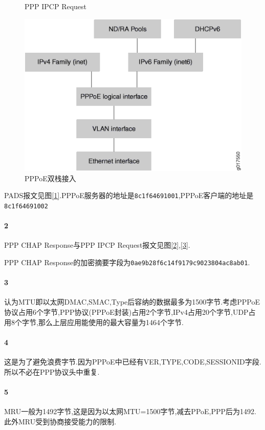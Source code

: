 \documentclass[a4paper]{article}
\begin{document}
\begin{figure}[H]
\begin{minipage}[t]{0.45\linewidth}
        \caption{PPP IPCP Request}
        \label{3}
    \end{minipage}
    \begin{minipage}[t]{0.45\linewidth}
        \centering
        \includegraphics[width=\linewidth]{PPPoE-4.png}
        \caption{PPPoE双栈接入}
        \label{4}
    \end{minipage}
\end{figure}
PADS报文见图\ref{1}.PPPoE服务器的地址是\verb|8c1f64691001|,PPPoE客户端的地址是\verb|8c1f64691002|
\paragraph{2}
PPP CHAP Response与PPP IPCP Request报文见图\ref{2},\ref{3}.

PPP CHAP Response的加密摘要字段为\verb|0ae9b28f6c14f9179c9023804ac8ab01|.
\paragraph{3}
认为MTU即以太网DMAC,SMAC,Type后容纳的数据最多为1500字节.考虑PPPoE协议占用6个字节,PPP协议(PPPoE封装)占用2个字节,IPv4占用20个字节,UDP占用8个字节,那么上层应用能使用的最大容量为1464个字节.
\paragraph{4}
这是为了避免浪费字节.因为PPPoE中已经有VER,TYPE,CODE,SESSIONID字段.所以不必在PPP协议头中重复.
\paragraph{5}
MRU一般为1492字节,这是因为以太网MTU=1500字节,减去PPoE,PPP后为1492.此外MRU受到协商接受能力的限制.
\end{document}
